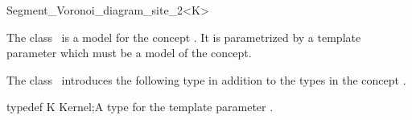 



\begin{ccRefClass}{Segment_Voronoi_diagram_site_2<K>}


\ccDefinition
  
The class \ccRefName\ is a model for the concept
. It is parametrized by a template
parameter  which must be a model of the  concept.


\ccIsModel
{}

\ccTypes

The class \ccRefName\ introduces the following type in addition to the
types in the concept .

\ccTypedef
{typedef K Kernel;}{A type for the template parameter .}




\end{ccRefClass}
